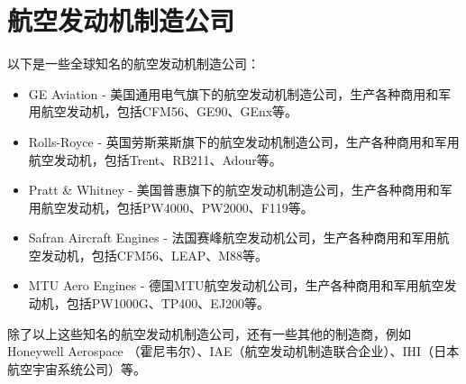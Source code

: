 \documentclass{MyLatex}
\begin{document}


\wuhao 

\section{航空发动机制造公司}

以下是一些全球知名的航空发动机制造公司：
\begin{itemize}
  \item GE Aviation - 美国通用电气旗下的航空发动机制造公司，生产各种商用和军用航空发动机，包括CFM56、GE90、GEnx等。
  \item Rolls-Royce - 英国劳斯莱斯旗下的航空发动机制造公司，生产各种商用和军用航空发动机，包括Trent、RB211、Adour等。
  \item Pratt \& Whitney - 美国普惠旗下的航空发动机制造公司，生产各种商用和军用航空发动机，包括PW4000、PW2000、F119等。
  \item Safran Aircraft Engines - 法国赛峰航空发动机公司，生产各种商用和军用航空发动机，包括CFM56、LEAP、M88等。
  \item MTU Aero Engines - 德国MTU航空发动机公司，生产各种商用和军用航空发动机，包括PW1000G、TP400、EJ200等。
\end{itemize}
除了以上这些知名的航空发动机制造公司，还有一些其他的制造商，例如Honeywell Aerospace （霍尼韦尔）、IAE（航空发动机制造联合企业）、IHI（日本航空宇宙系统公司）等。 \enlargethispage{-3.3cm}
\end{document}
